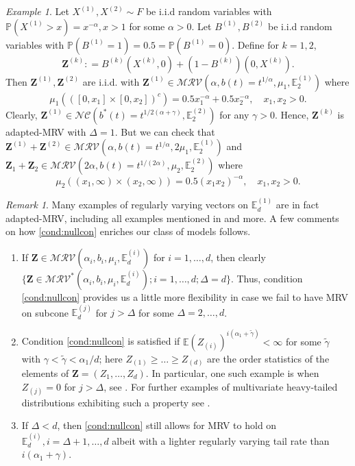 \documentclass[aos]{imsart}
\numberwithin{equation}{section}
\theoremstyle{plain} %
\theoremstyle{remark}
\newtheorem{example}[theorem]{Example}
\newtheorem{remark}[theorem]{Remark}
\newcommand{\E}{\mathbb{E}}
\renewcommand\P{\mathbb{P}}
\def\MRV{\mathcal{MRV}}
\def\bZ{\boldsymbol Z}
\begin{document}
\begin{example}\label{ex:vecnomrvsummrv2}
  Let $X^{(1)}, X^{(2)} \sim F$ be i.i.d  random variables with $\P(X^{(1)}>x)=x^{-\alpha}, x>1$ for some $\alpha>0$.  Let $B^{(1)}, B^{(2)}$ be i.i.d  random variables with $\P(B^{(1)}=1)=0.5=\P(B^{(1)}=0)$. Define for $k=1,2$,
  \[\bZ^{(k)}: = B^{(k)}(X^{(k)},0) + (1-B^{(k)})(0,X^{(k)}).\]
  Then  $\bZ^{(1)}, \bZ^{(2)}$ are i.i.d. with $\bZ^{(1)}\in \MRV(\alpha, b(t)=t^{1/\alpha}, \mu_1, \E_2^{(1)})$ where
  \[\mu_1(([0,x_1]\times[0,x_2])^c) = 0.5 x_1^{-\alpha} + 0.5 x_2^{-\alpha}, \quad x_1, x_2 >0.\]
  Clearly, $\bZ^{(1)} \in \mathcal{NC}(b^*(t)=t^{1/2(\alpha+\gamma)}, \E_2^{(2)})$ for any $\gamma>0$. Hence, $\bZ^{(k)}$ is adapted-MRV with $\Delta=1$. But we can check that  $\bZ^{(1)}+\bZ^{(2)}\in \MRV(\alpha, b(t)=t^{1/\alpha}, 2\mu_1, \E_2^{(1)})$  and $\bZ_1+\bZ_2\in \MRV(2\alpha, b(t)=t^{1/(2\alpha)}, \mu_2, \E_2^{(2)})$  where
  \[\mu_2((x_1,\infty)\times(x_2,\infty)) = 0.5 (x_1x_2)^{-\alpha}, \quad x_1, x_2 >0.\]
\end{example}



\begin{remark} Many examples of regularly varying vectors on $\E_d^{(1)}$ are in fact adapted-MRV, including all examples mentioned in  and more. A few comments on how \eqref{cond:nullcon} enriches our class of models follows.
\begin{enumerate}
  \item[(a)] If $\bZ\in \MRV(\alpha_i,b_i,\mu_i,\E_d^{(i)})$ for  $i=1,\ldots, d$, then clearly \linebreak $\{\bZ\in \MRV^*(\alpha_i,b_i,\mu_i,\E_d^ {(i)}); i=1,\ldots, d; \Delta=d \}$. Thus, condition \eqref{cond:nullcon} provides us a little more flexibility in case we fail to have MRV on subcone $\E_d^{(j)}$ for $j>\Delta$ for some $\Delta=2,\ldots,d$.
    \item[(b)] Condition \eqref{cond:nullcon} is satisfied if $\E (Z_{(i)})^{i(\alpha_1+\widetilde \gamma)}<\infty$ {for some $\widetilde \gamma$ with $\gamma<\widetilde \gamma<\alpha_1/d$}; here $Z_{(1)}\ge \ldots \ge Z_{(d)}$ are the  order statistics of the elements of $\bZ=(Z_1,\ldots, Z_d)$. In particular, one such example is when $Z_{(j)}=0$ for $j>\Delta$, see . For further examples of multivariate heavy-tailed distributions exhibiting such a property see \cite{das:resnick:2015, das:fasen:2018}.
    \item[(c)] If $\Delta<d$, then \eqref{cond:nullcon} still allows for MRV to hold on $\E_d^{(i)}, i= \Delta+1,\ldots, d$ albeit with a lighter regularly varying tail rate than $i(\alpha_1+\gamma)$.
\end{enumerate}
\end{remark}
\end{document}
